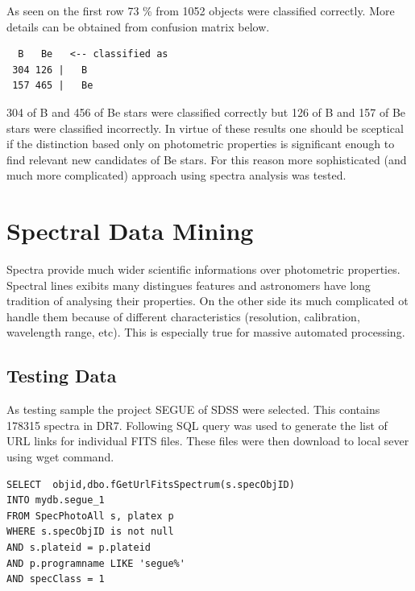 As seen on the first row 73 \% from  1052 objects were classified
correctly. More details can be obtained from confusion matrix below.

\begin{lstlisting}
  B   Be   <-- classified as
 304 126 |   B
 157 465 |   Be
\end{lstlisting}

304 of B and 456 of Be stars were classified correctly but 126 of B
and 157 of Be stars were classified incorrectly. In virtue of these
results one should be sceptical if the distinction based only on
photometric properties is significant enough to find relevant new
candidates of Be stars. For this reason more sophisticated (and much
more complicated) approach using spectra analysis was tested.

\section{Spectral Data Mining}
Spectra provide much wider scientific informations over photometric
properties. Spectral lines exibits many distingues features and
astronomers have long tradition of analysing their properties. On the
other side its much complicated ot handle them because of different
characteristics (resolution, calibration, wavelength range, etc). This
is especially true for massive automated processing.  

\subsection{Testing Data}
As testing sample the project SEGUE of SDSS were selected. This
contains 178315 spectra in DR7. Following SQL query was used to
generate the list of URL links for individual FITS files. These files
were then download to local sever using wget command.

\begin{lstlisting}
SELECT  objid,dbo.fGetUrlFitsSpectrum(s.specObjID)                                                           
INTO mydb.segue_1                                                                                     
FROM SpecPhotoAll s, platex p                                                                         
WHERE s.specObjID is not null                                                                         
AND s.plateid = p.plateid                                                                             
AND p.programname LIKE 'segue%'                                                                       
AND specClass = 1
\end{lstlisting}

